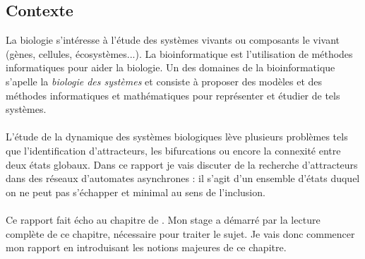 \documentclass[10pt,a4paper]{article}
\begin{document}
\subsection{Contexte}
La biologie s'intéresse à l'étude des systèmes vivants ou composants le vivant (gènes, cellules, écosystèmes...). La bioinformatique est l'utilisation de méthodes informatiques pour aider la biologie. Un des domaines de la 
bioinformatique s'apelle la \emph{biologie des systèmes} et consiste à proposer des modèles et des méthodes informatiques et mathématiques pour représenter et étudier de tels systèmes.\\ \\
L'étude de la dynamique des systèmes biologiques lève plusieurs problèmes tels que l'identification d'attracteurs, les bifurcations ou encore la connexité entre deux états globaux. Dans ce rapport je vais discuter de la recherche 
d'attracteurs dans des réseaux d'automates asynchrones : il s'agit d'un ensemble d'états duquel on ne peut pas s'échapper et minimal au sens de l'inclusion.\\ \\
Ce rapport fait écho au chapitre de \cite{chapitre}. Mon stage a démarré par la lecture complète de ce chapitre, nécessaire pour traiter le sujet.
Je vais donc commencer mon rapport en introduisant les notions majeures de ce chapitre.
\end{document}
